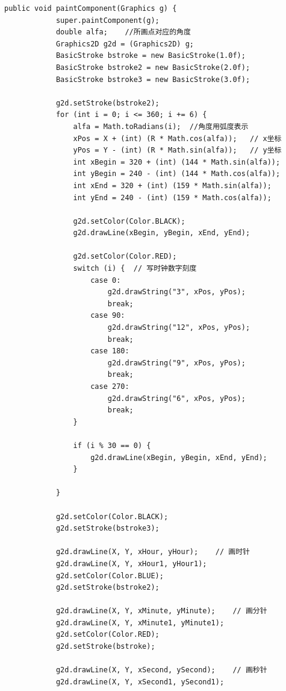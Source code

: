 \documentclass[UTF8,12pt]{article}
\begin{document}
\begin{lstlisting}[title=时钟面板的绘制,frame=shadowbox]
    public void paintComponent(Graphics g) {
            super.paintComponent(g);
            double alfa;    //所画点对应的角度
            Graphics2D g2d = (Graphics2D) g;
            BasicStroke bstroke = new BasicStroke(1.0f);
            BasicStroke bstroke2 = new BasicStroke(2.0f);
            BasicStroke bstroke3 = new BasicStroke(3.0f);

            g2d.setStroke(bstroke2);
            for (int i = 0; i <= 360; i += 6) {
                alfa = Math.toRadians(i);  //角度用弧度表示
                xPos = X + (int) (R * Math.cos(alfa));   // x坐标
                yPos = Y - (int) (R * Math.sin(alfa));   // y坐标
                int xBegin = 320 + (int) (144 * Math.sin(alfa));
                int yBegin = 240 - (int) (144 * Math.cos(alfa));
                int xEnd = 320 + (int) (159 * Math.sin(alfa));
                int yEnd = 240 - (int) (159 * Math.cos(alfa));

                g2d.setColor(Color.BLACK);
                g2d.drawLine(xBegin, yBegin, xEnd, yEnd);

                g2d.setColor(Color.RED);
                switch (i) {  // 写时钟数字刻度
                    case 0:
                        g2d.drawString("3", xPos, yPos);
                        break;
                    case 90:
                        g2d.drawString("12", xPos, yPos);
                        break;
                    case 180:
                        g2d.drawString("9", xPos, yPos);
                        break;
                    case 270:
                        g2d.drawString("6", xPos, yPos);
                        break;
                }

                if (i % 30 == 0) {
                    g2d.drawLine(xBegin, yBegin, xEnd, yEnd);
                }

            }

            g2d.setColor(Color.BLACK);
            g2d.setStroke(bstroke3);

            g2d.drawLine(X, Y, xHour, yHour);    // 画时针
            g2d.drawLine(X, Y, xHour1, yHour1);
            g2d.setColor(Color.BLUE);
            g2d.setStroke(bstroke2);

            g2d.drawLine(X, Y, xMinute, yMinute);    // 画分针
            g2d.drawLine(X, Y, xMinute1, yMinute1);
            g2d.setColor(Color.RED);
            g2d.setStroke(bstroke);

            g2d.drawLine(X, Y, xSecond, ySecond);    // 画秒针
            g2d.drawLine(X, Y, xSecond1, ySecond1);


\end{lstlisting}
\end{document}
